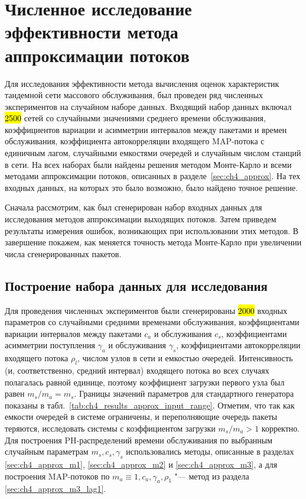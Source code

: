 \section{Численное исследование эффективности метода аппроксимации потоков}

Для исследования эффективности метода вычисления оценок характеристик тандемной сети массового обслуживания, был проведен ряд численных экспериментов на случайном наборе данных. Входящий набор данных включал \hl{2500} сетей со случайными значениями среднего времени обслуживания, коэффициентов вариации и асимметрии интервалов между пакетами и времен обслуживания, коэффициента автокорреляции входящего MAP-потока с единичным лагом, случайными емкостями очередей и случайным числом станций в сети. На всех наборах были найдены решения методом Монте-Карло и всеми методами аппроксимации потоков, описанных в разделе~\ref{sec:ch4_approx}. На тех входных данных, на которых это было возможно, было найдено точное решение.

Сначала рассмотрим, как был сгенерирован набор входных данных для исследования методов аппроксимации выходящих потоков. Затем приведем результаты измерения ошибок, возникающих при использовании этих методов. В завершение покажем, как меняется точность метода Монте-Карло при увеличении числа сгенерированных пакетов.


\subsection{Построение набора данных для исследования}

Для проведения численных экспериментов были сгенерированы \hl{2000} входных параметров со случайными средними временами обслуживания, коэффициентами вариации интервалов между пакетами $c_a$ и обслуживания $c_s$, коэффициентами асимметрии поступления $\gamma_a$ и обслуживания $\gamma_s$, коэффициентами автокорреляции входящего потока $\rho_l$, числом узлов в сети и емкостью очередей. Интенсивность (и, соответственно, средний интервал) входящего потока во всех случаях полагалась равной единице, поэтому коэффициент загрузки первого узла был равен $m_s / m_a = m_s$. Границы значений параметров для стандартного генератора показаны в табл.~\ref{tab:ch4_results_approx_input_range}. Отметим, что так как емкости очередей в системе ограничены, и переполняющие очередь пакеты теряются, исследовать системы с коэффициентом загрузки $m_s / m_a > 1$ корректно. Для построения PH-распределений времени обслуживания по выбранным случайным параметрам $m_s, c_s, \gamma_s$ использовались методы, описанные в разделах \ref{sec:ch4_approx_m1}, \ref{sec:ch4_approx_m2} и \ref{sec:ch4_approx_m3}, а для построения MAP-потоков по $m_a \equiv 1, c_a, \gamma_a, \rho_1$ "--- метод из раздела \ref{sec:ch4_approx_m3_lag1}.

